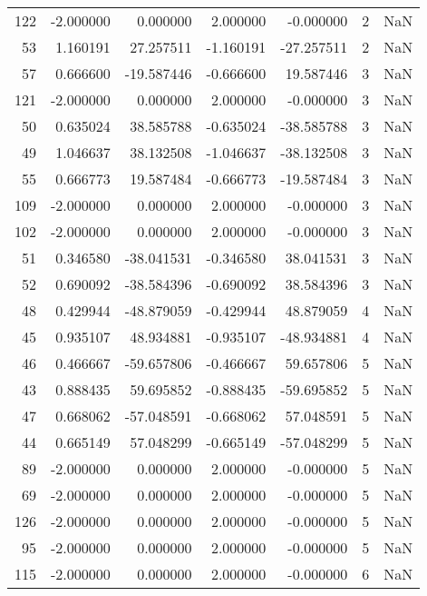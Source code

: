 \begin{tabular}{rrrrrrr}
122 & -2.000000 &    0.000000 &  2.000000 &   -0.000000 &           2 & NaN \\
 53 &  1.160191 &   27.257511 & -1.160191 &  -27.257511 &           2 & NaN \\
 57 &  0.666600 &  -19.587446 & -0.666600 &   19.587446 &           3 & NaN \\
121 & -2.000000 &    0.000000 &  2.000000 &   -0.000000 &           3 & NaN \\
 50 &  0.635024 &   38.585788 & -0.635024 &  -38.585788 &           3 & NaN \\
 49 &  1.046637 &   38.132508 & -1.046637 &  -38.132508 &           3 & NaN \\
 55 &  0.666773 &   19.587484 & -0.666773 &  -19.587484 &           3 & NaN \\
109 & -2.000000 &    0.000000 &  2.000000 &   -0.000000 &           3 & NaN \\
102 & -2.000000 &    0.000000 &  2.000000 &   -0.000000 &           3 & NaN \\
 51 &  0.346580 &  -38.041531 & -0.346580 &   38.041531 &           3 & NaN \\
 52 &  0.690092 &  -38.584396 & -0.690092 &   38.584396 &           3 & NaN \\
 48 &  0.429944 &  -48.879059 & -0.429944 &   48.879059 &           4 & NaN \\
 45 &  0.935107 &   48.934881 & -0.935107 &  -48.934881 &           4 & NaN \\
 46 &  0.466667 &  -59.657806 & -0.466667 &   59.657806 &           5 & NaN \\
 43 &  0.888435 &   59.695852 & -0.888435 &  -59.695852 &           5 & NaN \\
 47 &  0.668062 &  -57.048591 & -0.668062 &   57.048591 &           5 & NaN \\
 44 &  0.665149 &   57.048299 & -0.665149 &  -57.048299 &           5 & NaN \\
 89 & -2.000000 &    0.000000 &  2.000000 &   -0.000000 &           5 & NaN \\
 69 & -2.000000 &    0.000000 &  2.000000 &   -0.000000 &           5 & NaN \\
126 & -2.000000 &    0.000000 &  2.000000 &   -0.000000 &           5 & NaN \\
 95 & -2.000000 &    0.000000 &  2.000000 &   -0.000000 &           5 & NaN \\
115 & -2.000000 &    0.000000 &  2.000000 &   -0.000000 &           6 & NaN \\

\end{tabular}
